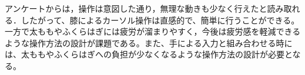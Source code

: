 \documentclass[submit, techrep]{ipsj}
\begin{document}
アンケートからは，操作は意図した通り，無理な動きも少なく行えたと読み取れる．したがって、膝によるカーソル操作は直感的で、簡単に行うことができる。一方で太ももやふくらはぎには疲労が溜まりやすく，今後は疲労感を軽減できるような操作方法の設計が課題である。また、手による入力と組み合わせる時には、太ももやふくらはぎへの負担が少なくなるような操作方法の設計が必要となる。



%
\end{document}
